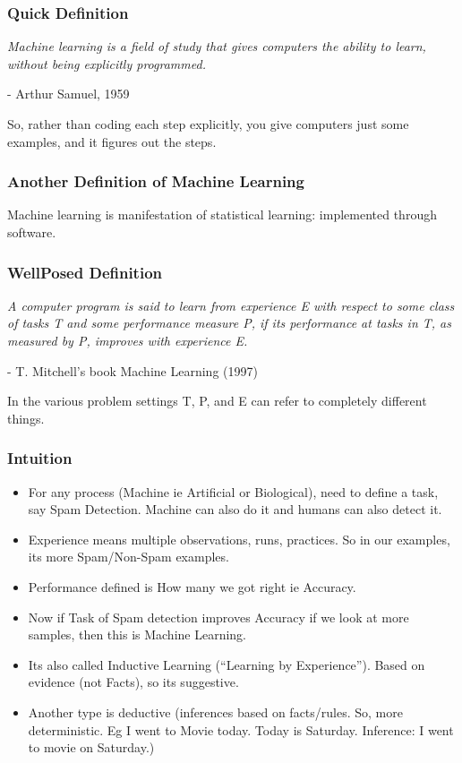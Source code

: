 \begin{frame}[fragile]\frametitle{Quick Definition}
{\it Machine learning is a field of study that gives computers the ability to learn, without being explicitly programmed.}

- Arthur Samuel, 1959

So, rather than coding each step explicitly, you give computers just some examples, and it figures out the steps.
\end{frame}

\begin{frame}[fragile]\frametitle{Another Definition of Machine Learning}
Machine learning is manifestation of statistical learning: implemented through software.
\end{frame}


\begin{frame}[fragile]\frametitle{WellPosed Definition}



{\it A computer program is said to learn from experience E with respect to some class of tasks T and some performance measure P, if its performance at tasks in T, as measured by P, improves with experience E.}

- T. Mitchell's book Machine Learning (1997)

In the various problem settings T, P, and E can refer to completely different things. 
\end{frame}

\begin{frame}[fragile]\frametitle{Intuition}
\begin{itemize}
\item For any process (Machine ie Artificial or Biological), need to define a task, say Spam Detection. Machine can also do it and humans can also detect it.
\item Experience means multiple observations, runs, practices. So in our examples, its more Spam/Non-Spam examples.
\item Performance defined is How many we got right ie Accuracy.
\item Now if Task of Spam detection improves Accuracy if we look at more samples, then this is Machine Learning.
\item Its also called Inductive Learning (``Learning by Experience''). Based on evidence (not Facts), so its suggestive.
\item Another type is deductive (inferences based on facts/rules. So, more deterministic. Eg I went to Movie today. Today is Saturday. Inference: I went to movie on Saturday.)
\end{itemize}
\end{frame}

